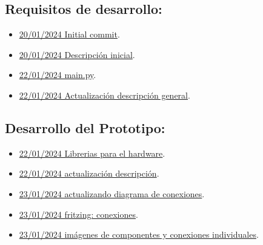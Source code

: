 \subsection{Requisitos de desarrollo:}
\begin{itemize}
\item \href{https://github.com/JLCaballeroMQ/Proyecto_TFG_UBU_23_24/tree/3ccbee3601f8daa05b77ecaaee85e79b8cc5096d}{20/01/2024 Initial commit}.
\item \href{https://github.com/JLCaballeroMQ/Proyecto_TFG_UBU_23_24/tree/ee2371b9cea962cccfbe2fbdd36a4b063335fbbb}{20/01/2024 Descripción inicial}.
\item \href{https://github.com/JLCaballeroMQ/Proyecto_TFG_UBU_23_24/tree/2f7dd2a4db33f9fae777dc720ab7f9d36baa93ba}{22/01/2024 main.py}.
\item \href{https://github.com/JLCaballeroMQ/Proyecto_TFG_UBU_23_24/tree/c513caeb06e930783d92673e138b5bcb5374fa9a}{22/01/2024 Actualización descripción general}.
\end{itemize}

\subsection{Desarrollo del Prototipo:}
\begin{itemize}
\item \href{https://github.com/JLCaballeroMQ/Proyecto_TFG_UBU_23_24/tree/a7cc3b37273cf2a0569f367426a830c4cd67be41}{22/01/2024 Librerias para el hardware}.
\item \href{https://github.com/JLCaballeroMQ/Proyecto_TFG_UBU_23_24/tree/f0508f25c715b820f8c66d81d5a37358dcef4188}{22/01/2024 actualización descripción}.
\item \href{https://github.com/JLCaballeroMQ/Proyecto_TFG_UBU_23_24/tree/c211b460fad76fb0b5105ad3b4b82a99f4d6ff1d}{23/01/2024 actualizando diagrama de conexiones}.
\item \href{https://github.com/JLCaballeroMQ/Proyecto_TFG_UBU_23_24/tree/4b8af308869df57dfe64a1a22c0d75322a33b546}{23/01/2024 fritzing: conexiones}.
\item \href{https://github.com/JLCaballeroMQ/Proyecto_TFG_UBU_23_24/tree/a4770260543238966607c17d85058db074cd156f}{23/01/2024 imágenes de componentes y conexiones individuales}.
\end{itemize}

